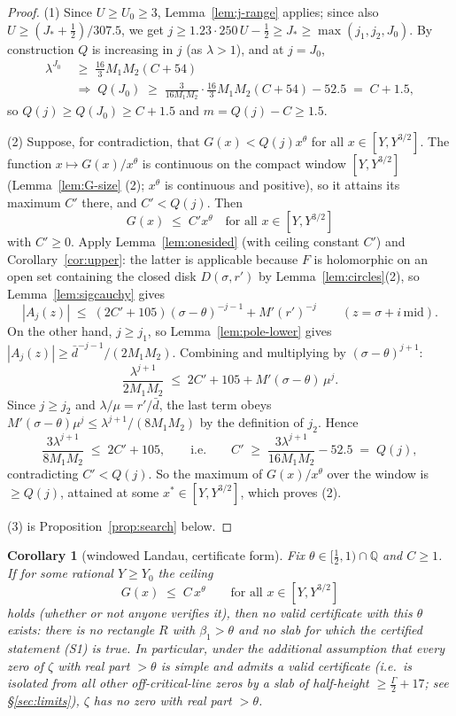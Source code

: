 \documentclass[11pt]{amsart}
\newtheorem{corollary}[theorem]{Corollary}
\numberwithin{equation}{section}
\newcommand{\Q}{\mathbb{Q}}
\newcommand{\Sig}{\sigma}
\newcommand{\dbar}{\bar{d}}
\begin{document}
\begin{proof}
(1) Since $U \ge U_0 \ge 3$, Lemma~\ref{lem:j-range} applies; since
also $U \ge (J_* + \tfrac12)/307.5$, we get
$j \ge 1.23 \cdot 250\, U - \tfrac12 \ge J_* \ge \max(j_1, j_2, J_0)$.
By construction $Q$ is increasing in $j$ (as $\lambda > 1$), and at
$j = J_0$,
\[
\begin{split}
\lambda^{J_0} \;&\ge\; \tfrac{16}{3} M_1 M_2 (C+54)\\
\;&\Longrightarrow\;
Q(J_0) \;\ge\; \tfrac{3}{16M_1M_2}\cdot\tfrac{16}{3}M_1M_2(C+54)
- 52.5 \;=\; C + 1.5,
\end{split}
\]
so $Q(j) \ge Q(J_0) \ge C + 1.5$ and $m = Q(j) - C \ge 1.5$.

(2) Suppose, for contradiction, that $G(x) < Q(j) x^{\theta}$ for all
$x \in [Y, Y^{3/2}]$. The function $x \mapsto G(x)/x^{\theta}$ is
continuous on the compact window $[Y, Y^{3/2}]$ (Lemma~\ref{lem:G-size}
(2); $x^\theta$ is continuous and positive), so it attains its maximum
$C'$ there, and $C' < Q(j)$. Then
\[
G(x) \;\le\; C' x^{\theta} \quad\text{for all } x \in [Y, Y^{3/2}]
\]
with $C' \ge 0$. Apply Lemma~\ref{lem:onesided} (with ceiling constant
$C'$) and Corollary~\ref{cor:upper}: the latter is applicable because
$F$ is holomorphic on an open set containing the closed disk
$D(\Sig, r')$ by Lemma~\ref{lem:circles}(2), so
Lemma~\ref{lem:sigcauchy} gives
\[
|A_j(z)| \;\le\; (2C' + 105)(\Sig-\theta)^{-j-1} + M' (r')^{-j}
\qquad (z = \Sig + i\,\mathrm{mid}).
\]
On the other hand, $j \ge j_1$, so Lemma~\ref{lem:pole-lower} gives
$|A_j(z)| \ge \dbar^{-j-1}/(2M_1M_2)$. Combining and multiplying by
$(\Sig-\theta)^{j+1}$:
\[
\frac{\lambda^{j+1}}{2M_1M_2}
\;\le\; 2C' + 105 + M'(\Sig-\theta)\,\mu^{j}.
\]
Since $j \ge j_2$ and $\lambda/\mu = r'/\dbar$, the last term obeys
$M'(\Sig-\theta)\mu^j \le \lambda^{j+1}/(8M_1M_2)$ by the definition
of $j_2$. Hence
\[
\frac{3\lambda^{j+1}}{8M_1M_2} \;\le\; 2C' + 105,
\qquad\text{i.e.}\qquad
C' \;\ge\; \frac{3\lambda^{j+1}}{16M_1M_2} - 52.5 \;=\; Q(j),
\]
contradicting $C' < Q(j)$. So the maximum of $G(x)/x^{\theta}$ over
the window is $\ge Q(j)$, attained at some $x^* \in [Y, Y^{3/2}]$,
which proves (2).

(3) is Proposition~\ref{prop:search} below.
\end{proof}

\begin{corollary}[windowed Landau, certificate form]\label{cor:landau}
Fix $\theta \in [\tfrac12, 1) \cap \Q$ and $C \ge 1$. If for some
rational $Y \ge Y_0$ the ceiling
\[
G(x) \;\le\; C\,x^{\theta} \qquad\text{for all } x \in [Y, Y^{3/2}]
\]
holds (whether or not anyone verifies it), then no valid certificate
with this $\theta$ exists: there is no rectangle $R$ with
$\beta_1 > \theta$ and no slab for which the certified statement (S1)
is true. In particular, under the additional assumption that every
zero of $\zeta$ with real part $> \theta$ is simple and admits a
valid certificate (i.e.\ is isolated from all other off-critical-line
zeros by a slab of half-height $\ge \tfrac{\Gamma}{2} + 17$; see
\S\ref{sec:limits}), $\zeta$ has no zero with real part $> \theta$.
\end{corollary}
\end{document}
